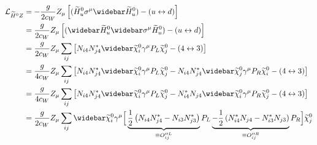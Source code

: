 \documentclass[english, notitlepage]{article}
\begin{document}
            \begin{align} \nonumber
                \L_{\wtilde{H}^0Z} & = -\frac{g}{2c_W} Z_\mu \bclosed{(\hinou\sigma^\mu\barhinou) - (u \leftrightarrow d)}                                                                                                                                                                                                     \\ \nonumber
                                   & = \frac{g}{2c_W} Z_\mu \bclosed{(\barhinou\wbar{\sigma}^\mu\hinou) - (u \leftrightarrow d)}                                                                                                                                                                                               \\ \nonumber
                                   & = \frac{g}{2c_W} Z_\mu \sum_{ij} \bclosed{N_{i4}N_{j4}^* \barnino[i]\gamma^\mu P_L \nino[j] - (4 \leftrightarrow 3)}                                                                                                                                                                      \\ \nonumber
                                   & = \frac{g}{4c_W} Z_\mu \sum_{ij} \bclosed{N_{i4}N_{j4}^* \barnino[i]\gamma^\mu P_L \nino[j] - N_{i4}N_{j4}^* \barnino[j]\gamma^\mu P_R \nino[i] - (4 \leftrightarrow 3)}                                                                                                                  \\ \nonumber
                                   & = \frac{g}{4c_W} Z_\mu \sum_{ij} \bclosed{N_{i4}N_{j4}^* \barnino[i]\gamma^\mu P_L \nino[j] - N_{i4}^*N_{j4} \barnino[i]\gamma^\mu P_R \nino[j] - (4 \leftrightarrow 3)}                                                                                                                  \\
                                   & = \frac{g}{2c_W} Z_\mu \sum_{ij} \barnino[i] \gamma^\mu \Big[ \underbrace{\frac{1}{2}\pclosed{N_{i4}N_{j4}^* - N_{i3}N_{j3}^*}}_{\equiv O^{\prime\prime L}_{ij}}P_L \underbrace{-\frac{1}{2}\pclosed{N_{i4}^*N_{j4} - N_{i3}^*N_{j3}}}_{\equiv O^{\prime\prime R}_{ij}}P_R \Big] \nino[j]
            \end{align}

\end{document}
